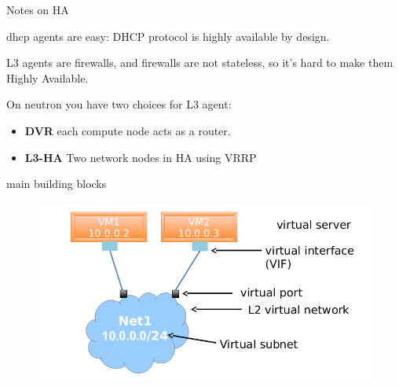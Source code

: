 \documentclass[english,serif,mathserif,xcolor=pdftex,dvipsnames,table]{beamer}
\begin{document}
\begin{frame}
  {Notes on HA} 


  dhcp agents are easy: DHCP protocol is highly available by design.

\+

L3 agents are firewalls, and firewalls are not stateless, so it's hard
to make them Highly Available.

\+

On neutron you have two choices for L3 agent:
  \begin{itemize}
  \item \textbf{DVR} each compute node acts as a router.
  \item \textbf{L3-HA} Two network nodes in HA using VRRP
  \end{itemize}

\end{frame}

\begin{frame}
  {main building blocks}
  \begin{figure}
    \centering
    \includegraphics[width=0.9\linewidth]{neutron_concept}
  \end{figure}
\end{frame}
\end{document}
